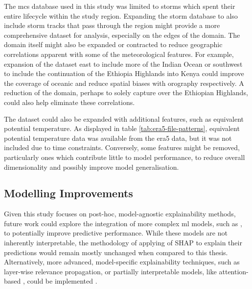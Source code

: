 The \acrshort{mcs} database used in this study was limited to storms which spent their entire lifecycle within the study region. Expanding the storm database to also include storm tracks that pass through the region might provide a more comprehensive dataset for analysis, especially on the edges of the domain. The domain itself might also be expanded or contracted to reduce geographic correlations apparent with some of the meteorological features. For example, expansion of the dataset east to include more of the Indian Ocean or southwest to include the continuation of the Ethiopia Highlands into Kenya could improve the coverage of oceanic  and reduce spatial biases with orography respectively. A reduction of the domain, perhaps to solely capture  over the Ethiopian Highlands, could also help eliminate these correlations.

The dataset could also be expanded with additional features, such as equivalent potential temperature. As displayed in table \ref{tab:era5-file-patterns}, equivalent potential temperature data was available from the \acrshort{era5} data, but it was not included due to time constraints. Conversely, some features might be removed, particularly ones which contribute little to model performance, to reduce overall dimensionality and possibly improve model generalisation.

\subsection{Modelling Improvements}

Given this study focuses on post-hoc, model-agnostic explainability methods, future work could explore the integration of more complex \acrshort{ml} models, such as , to potentially improve predictive performance. While these models are not inherently interpretable, the methodology of applying of SHAP to explain their predictions would remain mostly unchanged when compared to this thesis. Alternatively, more advanced, model-specific explainability techniques, such as layer-wise relevance propagation, or partially interpretable models, like attention-based , could be implemented \citep{Zhuo2021,FurkanTekin2021}.